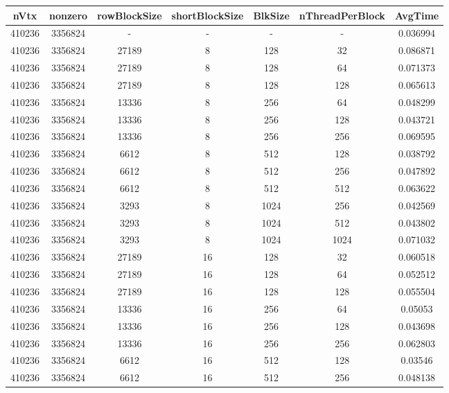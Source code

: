 \documentclass[9pt]{article}
\begin{document}
\SetBgPosition{0.25cm,-5.0cm}
\begin{tabular}{|c|c|c|c|c|c|c| }  
\hline
nVtx  & nonzero  & rowBlockSize  & shortBlockSize  & BlkSize  & nThreadPerBlock  & AvgTime \\
\hline
410236  & 3356824  &  -  & -  & -  & -  &0.036994 \\
\hline
410236  & 3356824  & 27189  & 8  & 128  & 32  & 0.086871 \\
\hline
410236  & 3356824  & 27189  & 8  & 128  & 64  & 0.071373 \\
\hline
410236  & 3356824  & 27189  & 8  & 128  & 128  & 0.065613 \\
\hline
410236  & 3356824  & 13336  & 8  & 256  & 64  & 0.048299 \\
\hline
410236  & 3356824  & 13336  & 8  & 256  & 128  & 0.043721 \\
\hline
410236  & 3356824  & 13336  & 8  & 256  & 256  & 0.069595 \\
\hline
410236  & 3356824  & 6612  & 8  & 512  & 128  & 0.038792 \\
\hline
410236  & 3356824  & 6612  & 8  & 512  & 256  & 0.047892 \\
\hline
410236  & 3356824  & 6612  & 8  & 512  & 512  & 0.063622 \\
\hline
410236  & 3356824  & 3293  & 8  & 1024  & 256  & 0.042569 \\
\hline
410236  & 3356824  & 3293  & 8  & 1024  & 512  & 0.043802 \\
\hline
410236  & 3356824  & 3293  & 8  & 1024  & 1024  & 0.071032 \\
\hline
410236  & 3356824  & 27189  & 16  & 128  & 32  & 0.060518 \\
\hline
410236  & 3356824  & 27189  & 16  & 128  & 64  & 0.052512 \\
\hline
410236  & 3356824  & 27189  & 16  & 128  & 128  & 0.055504 \\
\hline
410236  & 3356824  & 13336  & 16  & 256  & 64  & 0.05053 \\
\hline
410236  & 3356824  & 13336  & 16  & 256  & 128  & 0.043698 \\
\hline
410236  & 3356824  & 13336  & 16  & 256  & 256  & 0.062803 \\
\hline
410236  & 3356824  & 6612  & 16  & 512  & 128  & 0.03546 \\
\hline
410236  & 3356824  & 6612  & 16  & 512  & 256  & 0.048138 \\

\end{tabular}
\end{document}
